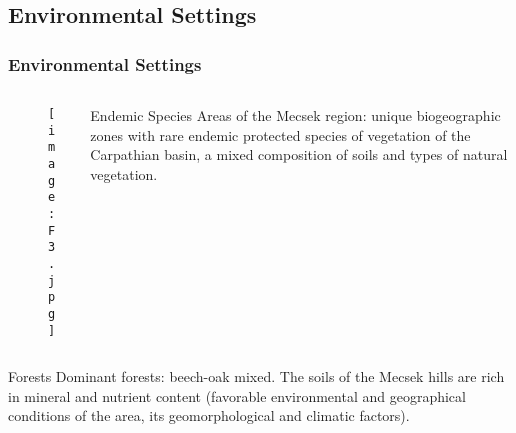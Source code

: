 \documentclass[pdflatex,compress,10pt,
	xcolor={dvipsnames,dvipsnames,svgnames,x11names,table},
	hyperref={
	breaklinks = true, 
	pdfauthor={Lemenkova Polina}, 
	pdfsubject={Preentation}, 
	pdfcreator={Lemenkova Polina}, 
	pdfproducer={Lemenkova Polina}, 
	citecolor=NavyBlue, 
	urlcolor = NavyBlue, 
	breaklinks = true}]{beamer}
\begin{document}
\subsection{Environmental Settings}
\begin{frame}\frametitle{Environmental Settings}
\begin{minipage}[0.4\textheight]{\textwidth}
\begin{columns}[T]
\begin{column}{0.5\textwidth}
\begin{figure}[H]
	\centering
		\texttt{[image: F3.jpg]}
\end{figure}
\end{column}
\begin{column}{0.5\textwidth}
\begin{block}{Endemic Species}
Areas of the Mecsek region: unique biogeographic zones with rare endemic protected species of vegetation of the Carpathian basin, a mixed composition of soils and types of natural vegetation.
\end{block}
\end{column}
\end{columns}
\end{minipage}

\begin{alertblock}{Forests}
Dominant forests: beech-oak mixed. The soils of the Mecsek hills are rich in mineral and nutrient content (favorable environmental and geographical conditions of the area, its geomorphological and climatic factors).
\end{alertblock}

\end{frame}
\end{document}
